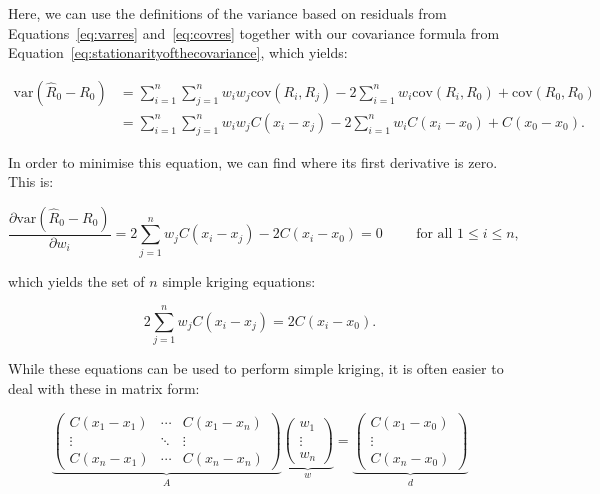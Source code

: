 Here, we can use the definitions of the variance based on residuals from Equations~\ref{eq:varres} and~\ref{eq:covres} together with our covariance formula from Equation~\ref{eq:stationarityofthecovariance}, which yields:

\begin{align}
\mathrm{var}\left(\hat{R}_0 - R_0\right) &= \sum_{i=1}^n \sum_{j=1}^n w_i w_j \mathrm{cov}(R_i, R_j) - 2\sum_{i=1}^n w_i \mathrm{cov}(R_i,R_0) + \mathrm{cov}(R_0, R_0) \label{eq:variancesk} \\
&= \sum_{i=1}^n \sum_{j=1}^n w_i w_j C(x_i-x_j) - 2\sum_{i=1}^n w_i C(x_i-x_0) + C(x_0-x_0).
\end{align}

In order to minimise this equation, we can find where its first derivative is zero.
This is:

\begin{equation}
\frac{\partial \mathrm{var}\left(\hat{R}_0 - R_0\right)}{\partial w_i} = 2 \sum_{j=1}^n w_j C(x_i-x_j) - 2C(x_i-x_0) = 0 \hspace{1cm} \text{for all } 1 \leq i \leq n, \nonumber
\end{equation}

which yields the set of \(n\) simple kriging equations:

\begin{equation}
2 \sum_{j=1}^n w_j C(x_i-x_j) = 2C(x_i-x_0).
\end{equation}

While these equations can be used to perform simple kriging, it is often easier to deal with these in matrix form:

\begin{equation}
%
\underbrace{\left( \begin{array}{ccc}
C(x_1-x_1) & \cdots & C(x_1-x_n) \\
\vdots & \ddots & \vdots \\
C(x_n-x_1) & \cdots & C(x_n-x_n) \end{array} \right)}_{A}
%
\underbrace{\left(\begin{array}{c}
w_1 \\
\vdots \\
w_n \end{array} \right)}_{w} = 
%
\underbrace{\left(\begin{array}{c}
C(x_1-x_0) \\
\vdots \\
C(x_n-x_0) \end{array} \right)}_{d}
\end{equation}

